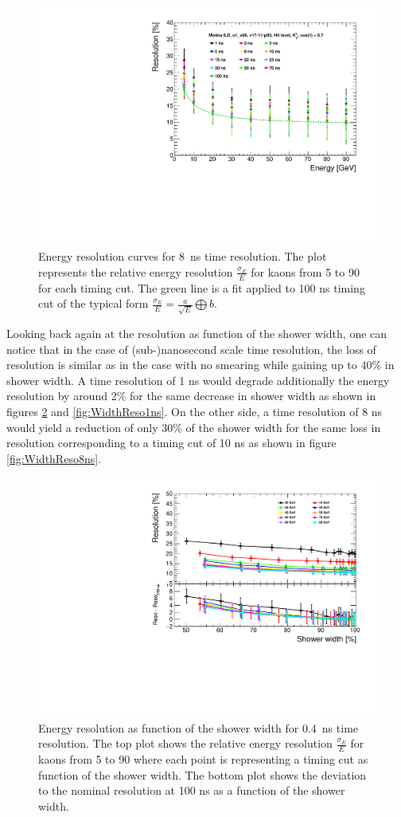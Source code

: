 \begin{figure}[htbp!]
  \centering
  \includegraphics[width=0.7\linewidth]{../Thesis_Plots/ILD/Smearing_8ns/Plots/ShowerResoAbsolute_TimeCuts_Smearing3}
  \caption{Energy resolution curves for \SI{8}{\nano\second} time resolution. The plot represents the relative energy resolution $\frac{\sigma_{E}}{E}$ for kaons from 5 to 90 \GeV for each timing cut. The green line is a fit applied to 100 ns timing cut of the typical form $\frac{\sigma_{E}}{E} = \frac{a}{\sqrt{E}} \bigoplus b$.}  \label{fig:Reso8ns}
\end{figure}

Looking back again at the resolution as function of the shower width, one can notice that in the case of (sub-)nanosecond scale time resolution, the loss of resolution is similar as in the case with no smearing while gaining up to 40\% in shower width. A time resolution of 1 ns would degrade additionally the energy resolution by around 2\% for the same decrease in shower width as shown in figures \ref{fig:WidthReso0.4ns} and \ref{fig:WidthReso1ns}. On the other side, a time resolution of 8 ns would yield a reduction of only 30\% of the shower width for the same loss in resolution corresponding to a timing cut of 10 ns as shown in figure \ref{fig:WidthReso8ns}.\\

\begin{figure}[htbp!]
  \centering
  \includegraphics[width=0.7\linewidth]{../Thesis_Plots/ILD/Smearing_0.4ns/Plots/ShowerWidth_Resolution_Smearing1}
  \caption{Energy resolution as function of the shower width for \SI{0.4}{\nano\second} time resolution. The top plot shows the relative energy resolution $\frac{\sigma_{E}}{E}$ for kaons from 5 to 90 \GeV where each point is representing a timing cut as function of the shower width. The bottom plot shows the deviation to the nominal resolution at 100 ns as a function of the shower width.} \label{fig:WidthReso0.4ns}
\end{figure}


